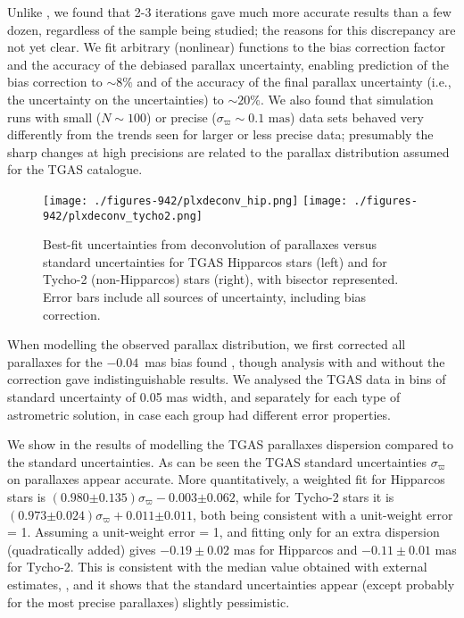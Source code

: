 Unlike \citeauthor{1995A&A...304...61L}, we found that 2-3 iterations gave much more accurate results than a few dozen, regardless of the sample being studied; the reasons for this discrepancy are not yet clear. We fit arbitrary (nonlinear) functions to the bias correction factor and the accuracy of the debiased parallax uncertainty, enabling prediction of the bias correction to $\sim 8\%$ and of the accuracy of the final parallax uncertainty (i.e., the uncertainty on the uncertainties) to $\sim 20\%$.
We also found that simulation runs with small ($N \sim 100$) or precise ($\sigma_\varpi \sim 0.1 \textrm{ mas}$) data sets behaved very differently from the trends seen for larger or less precise data; presumably the sharp changes at high precisions are related to the parallax distribution assumed for the TGAS catalogue.

\begin{figure}[tbhp]
\centering
\texttt{[image: ./figures-942/plxdeconv\_hip.png]}
\texttt{[image: ./figures-942/plxdeconv\_tycho2.png]}
\caption{Best-fit uncertainties from deconvolution of parallaxes versus standard uncertainties for TGAS Hipparcos stars (left) and for Tycho-2 (non-Hipparcos) stars (right), with bisector represented. Error bars include all sources of uncertainty, including bias correction.}\label{fig:wp942:parallaxdeconv}
\end{figure}

When modelling the observed parallax distribution, we first corrected all parallaxes for the $-0.04$~mas bias found , though analysis with and without the correction gave indistinguishable results. We analysed the TGAS data in bins of standard uncertainty of 0.05 mas width, and separately for each type of astrometric solution, in case each group had different error properties.

We show in  the results of modelling the TGAS 
parallaxes dispersion compared to the standard uncertainties. 
As can be seen the TGAS standard uncertainties $\sigma_\varpi$ on parallaxes 
appear accurate. More quantitatively, a weighted fit for Hipparcos stars is 
$(0.980{\scriptstyle\pm 0.135})\sigma_\varpi - 0.003{\scriptstyle\pm 0.062}$,
while for Tycho-2 stars it is 
$(0.973{\scriptstyle\pm 0.024})\sigma_\varpi +  0.011{\scriptstyle\pm 0.011}$,
both being consistent with a unit-weight error = 1. 
Assuming a unit-weight error = 1, and fitting only for an extra dispersion 
(quadratically added) gives $-0.19\pm 0.02$ mas for Hipparcos and 
$-0.11\pm 0.01$ mas for Tycho-2. This is consistent with the median value obtained 
with external estimates, , and it shows
that the standard uncertainties appear (except probably for the most precise 
parallaxes) slightly pessimistic. 

